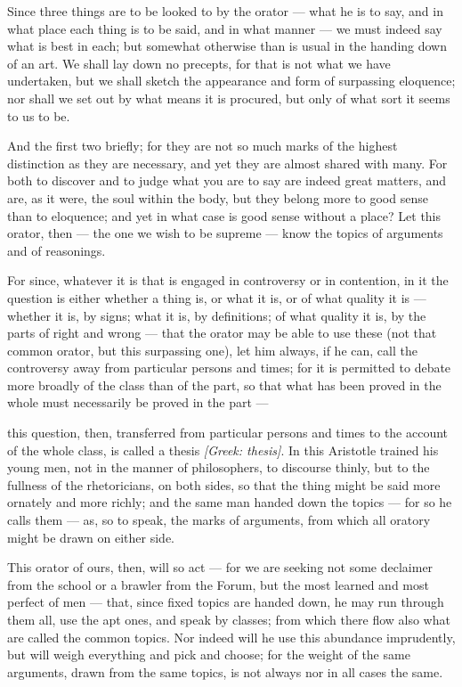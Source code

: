  Since three things are to be looked to by the orator — what he is to say, and in what place each thing is to be said, and in what manner — we must indeed say what is best in each; but somewhat otherwise than is usual in the handing down of an art. We shall lay down no precepts, for that is not what we have undertaken, but we shall sketch the appearance and form of surpassing eloquence; nor shall we set out by what means it is procured, but only of what sort it seems to us to be.

 And the first two briefly; for they are not so much marks of the highest distinction as they are necessary, and yet they are almost shared with many. For both to discover and to judge what you are to say are indeed great matters, and are, as it were, the soul within the body, but they belong more to good sense than to eloquence; and yet in what case is good sense without a place? Let this orator, then — the one we wish to be supreme — know the topics of arguments and of reasonings.

 For since, whatever it is that is engaged in controversy or in contention, in it the question is either whether a thing is, or what it is, or of what quality it is — whether it is, by signs; what it is, by definitions; of what quality it is, by the parts of right and wrong — that the orator may be able to use these (not that common orator, but this surpassing one), let him always, if he can, call the controversy away from particular persons and times; for it is permitted to debate more broadly of the class than of the part, so that what has been proved in the whole must necessarily be proved in the part —

 this question, then, transferred from particular persons and times to the account of the whole class, is called a thesis \textit{[Greek: thesis]}. In this Aristotle trained his young men, not in the manner of philosophers, to discourse thinly, but to the fullness of the rhetoricians, on both sides, so that the thing might be said more ornately and more richly; and the same man handed down the topics — for so he calls them — as, so to speak, the marks of arguments, from which all oratory might be drawn on either side.

 This orator of ours, then, will so act — for we are seeking not some declaimer from the school or a brawler from the Forum, but the most learned and most perfect of men — that, since fixed topics are handed down, he may run through them all, use the apt ones, and speak by classes; from which there flow also what are called the common topics. Nor indeed will he use this abundance imprudently, but will weigh everything and pick and choose; for the weight of the same arguments, drawn from the same topics, is not always nor in all cases the same.

